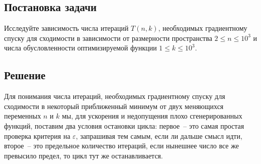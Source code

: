 \documentclass[12pt, a4paper, oneside, final]{article}
\begin{document}
	\subsection*{Постановка задачи}
	Исследуйте зависимость числа итераций $T(n, k)$, необходимых градиентному спуску для сходимости в зависимости от размерности пространства $2 \leqslant n \leqslant 10^{3}$ и числа обусловленности оптимизируемой функции $1 \leqslant k \leqslant 10^{3}$. 
	\subsection*{Решение}
	Для понимания числа итераций, необходимых градиентному спуску для сходимости в некоторый приближенный минимум от двух меняющихся переменных $n$ и $k$ мы, для ускорения и недопущения плохо сгенерированных функций, поставим два условия остановки цикла: первое~-- это самая простая проверка критерия на $\varepsilon$, запрашивая тем самым, если ли дальше смысл идти, второе~-- это предельное количество итераций, если нынешнее число все же превысило предел, то цикл тут же останавливается.
\end{document}

